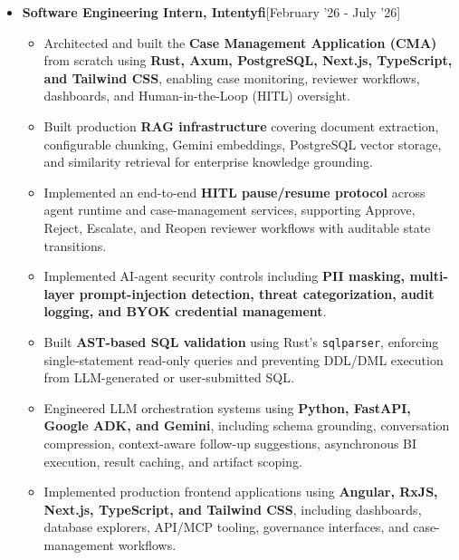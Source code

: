 \documentclass[a4paper,10pt]{article}
\newcommand{\isep}{-2 pt}
\begin{document}
\begin{itemize} \itemsep \isep


    \item \textbf{Software Engineering Intern, Intentyfi}\hfill [February '26 - July '26]
    \\[-0.6cm]

    \begin{itemize}\itemsep \isep

        \item Architected and built the \textbf{Case Management Application (CMA)} from scratch using \textbf{Rust, Axum, PostgreSQL, Next.js, TypeScript, and Tailwind CSS}, enabling case monitoring, reviewer workflows, dashboards, and Human-in-the-Loop (HITL) oversight.

        \item Built production \textbf{RAG infrastructure} covering document extraction, configurable chunking, Gemini embeddings, PostgreSQL vector storage, and similarity retrieval for enterprise knowledge grounding.

        \item Implemented an end-to-end \textbf{HITL pause/resume protocol} across agent runtime and case-management services, supporting Approve, Reject, Escalate, and Reopen reviewer workflows with auditable state transitions.

        \item Implemented AI-agent security controls including \textbf{PII masking, multi-layer prompt-injection detection, threat categorization, audit logging, and BYOK credential management}.

        \item Built \textbf{AST-based SQL validation} using Rust's \texttt{sqlparser}, enforcing single-statement read-only queries and preventing DDL/DML execution from LLM-generated or user-submitted SQL.

        \item Engineered LLM orchestration systems using \textbf{Python, FastAPI, Google ADK, and Gemini}, including schema grounding, conversation compression, context-aware follow-up suggestions, asynchronous BI execution, result caching, and artifact scoping.

        \item Implemented production frontend applications using \textbf{Angular, RxJS, Next.js, TypeScript, and Tailwind CSS}, including dashboards, database explorers, API/MCP tooling, governance interfaces, and case-management workflows.


\end{itemize}
\end{itemize}
\end{document}
